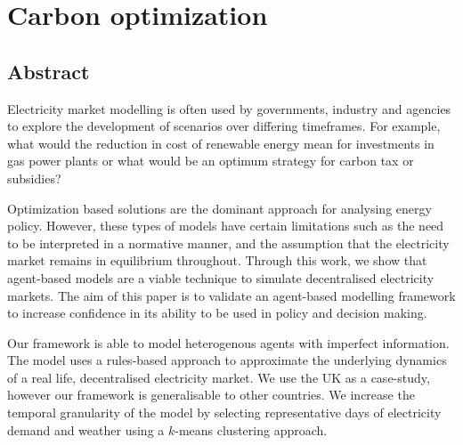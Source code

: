\chapter{Carbon optimization}

\ifpdf
    \graphicspath{{Chapter3/Figs/Raster/}{Chapter3/Figs/PDF/}{Chapter3/Figs/}}
\else
    \graphicspath{{Chapter3/Figs/Vector/}{Chapter3/Figs/}}
\fi

\section{Abstract}

Electricity market modelling is often used by governments, industry and agencies to explore the development of scenarios over differing timeframes. For example, what would the reduction in cost of renewable energy mean for investments in gas power plants or what would be an optimum strategy for carbon tax or subsidies? %

Optimization based solutions are the dominant approach for analysing energy policy. However, these types of models have certain limitations such as the need to be interpreted in a normative manner, and the assumption that the electricity market remains in equilibrium throughout. Through this work, we show that agent-based models are a viable technique to simulate decentralised electricity markets. The aim of this paper is to validate an agent-based modelling framework to increase confidence in its ability to be used in policy and decision making. 



Our framework is able to model heterogenous agents with imperfect information. The model uses a rules-based approach to approximate the underlying dynamics of a real life, decentralised electricity market. We use the UK as a case-study, however our framework is generalisable to other countries. We increase the temporal granularity of the model by selecting representative days of electricity demand and weather using a $k$-means clustering approach. 


